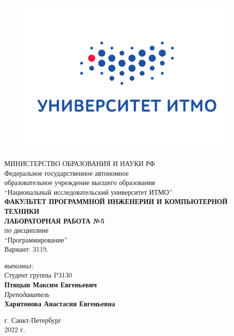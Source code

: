 \begin{center}

	\begin{figure}[H]
	\centering
	\includegraphics[scale=0.3]{img/logo}
	\end{figure}
	\hfill \break
	МИНИСТЕРСТВО ОБРАЗОВАНИЯ И НАУКИ РФ\\
	\hfill \break
	Федеральное государственное автономное\\
	образовательное учреждение высшего образования\\
	``Национальный исследовательский университет ИТМО''\\
	\hfill \break
	\textbf{ФАКУЛЬТЕТ ПРОГРАММНОЙ ИНЖЕНЕРИИ И КОМПЬЮТЕРНОЙ ТЕХНИКИ}\\
	\vspace{3cm}
	\large{\textbf{ЛАБОРАТОРНАЯ РАБОТА №5}}\\
	\hfill \break
	по дисциплине\\
	\large{``Программирование''}\\
	\hfill \break
	Вариант: 3119.
	\vspace{5cm}
	\begin{flushright}
	\textit{выполнил:}\\
	Студент группы P3130\\
	\textbf{Птицын Максим Евгеньевич}\\
	\textit{Преподаватель}\\
	\textbf{Харитонова Анастасия Евгеньевна}
	\end{flushright}
\end{center}

\vfill


\begin{center} г. Санкт-Петербург\\2022 г.
\end{center}

\thispagestyle{empty}
\newpage